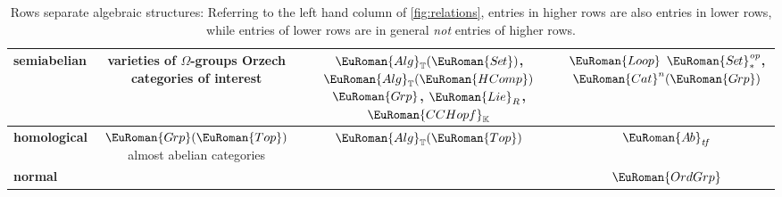 \documentclass [12pt,oneside]{book}%
\theoremstyle{captionstyle}  %
\newcommand{\TT}{\ensuremath{\mathbb{T}}}
\newcommand{\Sets}{\EuRoman{S{\kern-0.12ex}e{\hskip-0.14ex}t}}			                       %
\newcommand{\Grps}{\EuRoman{G{\kern -.15ex}rp}}				%
\newcommand{\CCHopfK}{\EuRoman{CCHopf}_\mathbb{K}}
\newcommand{\Loop}{\EuRoman{Loop}}
\newcommand{\Tops}{\EuRoman{Top}}											%
\newcommand{\HComp}{\ensuremath{\EuRoman{HComp}}}		%
\newcommand{\Alg}{\ensuremath{\EuRoman{Alg}}}
\newcommand{\Cat}{\ensuremath{\EuRoman{Cat}}}
\newcommand{\AbGrps}{\EuRoman{A{\kern-0.15ex}b}}	%
\newcommand{\OrdGrp}{\ensuremath{\EuRoman{OrdGrp}}}
\newcommand{\Lie}{\ensuremath{\EuRoman{Lie}}}
\newcommand{\op}{\ensuremath{\mathit{op}}}
\begin{document}
\begin{table}[bth!]
    \begin{center}
        {\small\begin{tabular}{lccc}
                \toprule
                \textbf{semiabelian}                                        & \txt{varieties of $\Omega$-groups                                                     \\
                Orzech categories of interest}                              & \txt{ $\Alg_{\TT}(\Sets)$, $\Alg_{\TT}(\HComp)$                                       \\
                $\Grps$, $\Lie_R$, $\CCHopfK$ }                             & \txt{$\Loop$                                                                          \\
                $\Sets^{\op}_{*}$, $\Cat^n(\Grps)$}                                                                                                                 \\
                \midrule
                \textbf{homological}                                        & \txt{$\Grps(\Tops)$                                                                   \\
                almost abelian categories                                 } & $\Alg_{\TT}(\Tops)$                             & $\AbGrps_{\mathit{tf}}$             \\
                \midrule
                \textbf{normal}                                             &                                                 &                         & $\OrdGrp$ \\
                \bottomrule
            \end{tabular}}
    \end{center}
    \caption{Rows separate algebraic structures: Referring to the left hand column of \ref{fig:relations}, entries in higher rows are also entries in lower rows, while entries of lower rows are in general \emph{not} entries of higher rows. }\label{tab:Examples}
\end{table}
\end{document}
